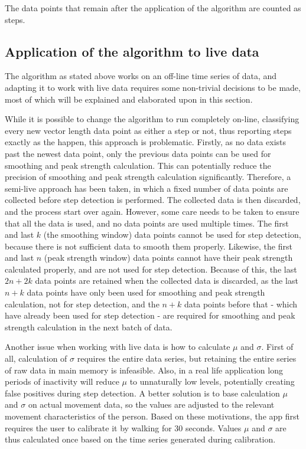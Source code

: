 The data points that remain after the application of the algorithm are counted as steps.

\subsection{Application of the algorithm to live data}
The algorithm as stated above works on an off-line time series of data, and adapting it to work with live data requires some non-trivial decisions to be made, most of which will be explained and elaborated upon in this section. 

While it is possible to change the algorithm to run completely on-line, classifying every new vector length data point as either a step or not, thus reporting steps exactly as the happen, this approach is problematic. Firstly, as no data exists past the newest data point, only the previous data points can be used for smoothing and peak strength calculation. This can potentially reduce the precision of smoothing and peak strength calculation significantly. Therefore, a semi-live approach has been taken, in which a fixed number of data points are collected before step detection is performed. The collected data is then discarded, and the process start over again. However, some care needs to be taken to ensure that all the data is used, and no data points are used multiple times. The first and last $k$ (the smoothing window) data points cannot be used for step detection, because there is not sufficient data to smooth them properly. Likewise, the first and last $n$ (peak strength window) data points cannot have their peak strength calculated properly, and are not used for step detection. Because of this, the last $2n + 2k$ data points are retained when the collected data is discarded, as the last $n+k$ data points have only been used for smoothing and peak strength calculation, not for step detection, and the $n+k$ data points before that - which have already been used for step detection - are required for smoothing and peak strength calculation in the next batch of data.

Another issue when working with live data is how to calculate $\mu$ and $\sigma$. First of all, calculation of $\sigma$ requires the entire data series, but retaining the entire series of raw data in main memory is infeasible. Also, in a real life application long periods of inactivity will reduce $\mu$ to unnaturally low levels, potentially creating false positives during step detection. A better solution is to base calculation $\mu$ and $\sigma$ on actual movement data, so the values are adjusted to the relevant movement characteristics of the person. Based on these motivations, the app first requires the user to calibrate it by walking for 30 seconds. Values $\mu$ and $\sigma$ are thus calculated once based on the time series generated during calibration. 


